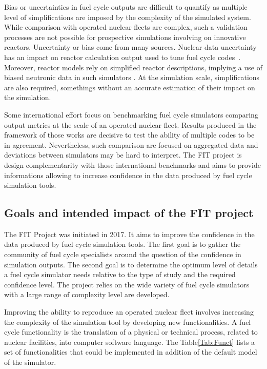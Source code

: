 Bias or uncertainties in fuel cycle outputs are difficult to quantify as
multiple level of simplifications are imposed by the complexity of the simulated
system. While comparison with operated nuclear fleets are complex, such a
validation processes are not possible for prospective simulations involving on
innovative reactors. Uncertainty or bias come from many sources. Nuclear data
uncertainty has an impact on reactor calculation output used to tune fuel cycle
codes~\cite{Krivtchik_2014}. Moreover, reactor models rely on simplified reactor
descriptions, implying a use of biased neutronic data in such simulators
\cite{Somaini_2017}.  At the simulation scale, simplifications are also
required, somethings without an accurate estimation of their impact on the
simulation. 

Some international effort \cite{NEA2016} focus on benchmarking fuel cycle
simulators comparing output metrics at the scale of an operated nuclear fleet.
Results produced in the framework of those works are decisive to test the
ability of multiple codes to be in agreement. Nevertheless, such comparison are
focused on aggregated data and deviations between simulators may be hard to
interpret. The FIT project is design complementarity with those international
benchmarks and aims to provide informations allowing to increase confidence in
the data produced by fuel cycle simulation tools.

\subsection{Goals and intended impact of the FIT project}

The FIT Project was initiated in 2017. It aims to improve the confidence in the
data produced by fuel cycle simulation tools. The first goal is to gather the
community of fuel cycle specialists around the question of the confidence in
simulation outputs. The second goal is to determine the optimum level of details
a fuel cycle simulator needs relative to the type of study and the required
confidence level. The project relies on the wide variety of fuel cycle
simulators with a large range of complexity level are developed.

Improving the ability to reproduce an operated nuclear fleet involves increasing
the complexity of the simulation tool by developing new functionalities. A fuel
cycle functionality is the translation of a physical or technical process,
related to nuclear facilities, into computer software language. The
Table\ref{Tab:Funct} lists a set of functionalities that could be implemented
in addition of the default model of the simulator.

